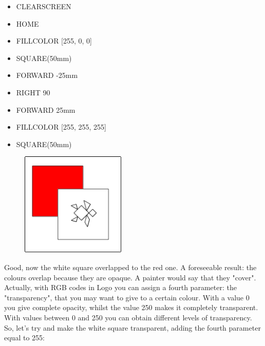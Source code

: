 \vskip 1cm

\begin{scriptsize}
\begin{minipage}{0.40\textwidth}
\begin{itemize}[itemsep=-3pt,parsep=2pt]
\item[] CLEARSCREEN
\item[] HOME
\item[] FILLCOLOR [255, 0, 0]                                
\item[] SQUARE(50mm)
\item[] FORWARD -25mm
\item[] RIGHT 90                                             
\item[] FORWARD 25mm
\item[] FILLCOLOR [255, 255, 255]
\item[] SQUARE(50mm)                                         
\end{itemize}
\end{minipage}
\end{scriptsize}
\begin{minipage}{0.4\textwidth}
\begin{figure}[H]
   \includegraphics[width=5.0cm,trim=4 4 8 4,clip]{./images/disegnare/disegnare-18.png}
   \label{dis-17}
\end{figure}
\end{minipage} \hfill

\vskip 1cm

Good, now the white square overlapped to the red one. A foreseeable result: the colours overlap because they are opaque. A painter would say that they "cover". Actually, with RGB codes in Logo you can assign a fourth parameter: the "transparency", that you may want to give to a certain colour. With a value 0 you give complete opacity, whilst the value 250 makes it completely transparent. With values between 0 and 250 you can obtain different levels of transparency. So, let's try and make the white square transparent, adding the fourth parameter equal to 255:

